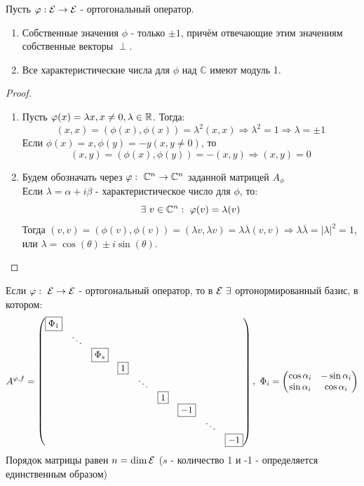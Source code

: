 \begin{theorem}
    Пусть $\varphi: \mathcal{E} \rightarrow \mathcal{E}$ - ортогональный оператор.
    \begin{enumerate}
        \item Собственные значения $\phi$ - только $\pm 1$, причём отвечающие этим значениям собственные векторы $\perp$.
        \item Все характеристические числа для $\phi$ над $\mathbb{C}$ имеют модуль 1. 
    \end{enumerate}
\end{theorem}
\begin{proof}\tab
    \begin{enumerate}
        \item Пусть $\varphi(x) = \lambda x, x \neq 0, \lambda \in \mathbb{R}$. Тогда:
        $$(x, x) = (\phi(x), \phi(x)) = \lambda^2(x,x) \Longrightarrow \lambda^2 = 1 \Longrightarrow \lambda = \pm 1$$ 
        Если $\phi(x) = x, \phi(y) = -y (x,y \neq 0)$, то
        $$(x, y) = (\phi(x), \phi(y)) = -(x, y) \Longrightarrow (x, y) = 0$$
        \item Будем обозначать через $\varphi: \ \mathbb{C}^n \to \mathbb{C}^n$ заданной матрицей $A_\phi$ \\
        Если $\lambda = \alpha + i\beta$ - характеристическое число для $\phi$, то: 
        $$\exists \ v \in \mathbb{C}^n: \ \varphi(v) = \lambda(v)$$
        Тогда $(v, v) = (\phi(v), \phi(v)) = (\lambda v, \lambda v) = \lambda \overline{\lambda}(v,v) \Longrightarrow \lambda \overline{\lambda} = |\lambda|^2 = 1$, или $\lambda = \cos(\theta) \pm i \sin(\theta)$.
    \end{enumerate}
\end{proof}
\begin{theorem}
    Если $\varphi: \ \mathcal{E} \to \mathcal{E}$ - ортогональный оператор, то в $\E \ \exists$ ортонормированный базис, в котором:
    $$A^{\phi,f} = \begin{pmatrix}
        \text{\fbox{$\Phi_1$}}\\
        \null & \ddots\\
        \null & \null & \text{\fbox{$\Phi_s$}}\\
        \null & \null & \null & \text{\fbox{$1$}} \\
        \null & \null & \null & \null & \ddots \\
        \null & \null & \null & \null & \null & \text{\fbox{$1$}}\\
        \null & \null & \null & \null & \null & \null & \text{\fbox{$-1$}} \\
        \null & \null & \null & \null & \null & \null & \null & \ddots \\
        \null & \null & \null & \null & \null & \null & \null & \null & \text{\fbox{$-1$}}
    \end{pmatrix}, \ \Phi_i = \begin{pmatrix}
        \cos \alpha_i & -\sin \alpha_i \\ \sin \alpha_i & \cos \alpha_i
    \end{pmatrix}$$   
    Порядок матрицы равен $ n = \dim \mathcal{E}$ ($s$ - количество 1 и -1 - определяется единственным образом) 
\end{theorem}
